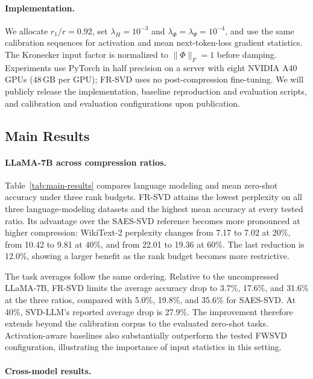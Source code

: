 \documentclass[11pt]{article}
\begin{document}
\paragraph{Implementation.}
We allocate $r_1/r=0.92$, set $\lambda_H=10^{-3}$ and $\lambda_\Phi=\lambda_\Psi=10^{-4}$, and use the same calibration sequences for activation and mean next-token-loss gradient statistics. The Kronecker input factor is normalized to $\|\Phi\|_F=1$ before damping. Experiments use PyTorch in half precision on a server with eight NVIDIA A40 GPUs (48\,GB per GPU); FR-SVD uses no post-compression fine-tuning. We will publicly release the implementation, baseline reproduction and evaluation scripts, and calibration and evaluation configurations upon publication.


\subsection{Main Results}\label{sec:main-results-llama7b}



\paragraph{LLaMA-7B across compression ratios.}

Table~\ref{tab:main-results} compares language modeling and mean zero-shot accuracy under three rank budgets. FR-SVD attains the lowest perplexity on all three language-modeling datasets and the highest mean accuracy at every tested ratio. Its advantage over the SAES-SVD reference becomes more pronounced at higher compression: WikiText-2 perplexity changes from 7.17 to 7.02 at 20\%, from 10.42 to 9.81 at 40\%, and from 22.01 to 19.36 at 60\%. The last reduction is 12.0\%, showing a larger benefit as the rank budget becomes more restrictive.

The task averages follow the same ordering. Relative to the uncompressed LLaMA-7B, FR-SVD limits the average accuracy drop to 3.7\%, 17.6\%, and 31.6\% at the three ratios, compared with 5.0\%, 19.8\%, and 35.6\% for SAES-SVD. At 40\%, SVD-LLM's reported average drop is 27.9\%. The improvement therefore extends beyond the calibration corpus to the evaluated zero-shot tasks. Activation-aware baselines also substantially outperform the tested FWSVD configuration, illustrating the importance of input statistics in this setting.

\paragraph{Cross-model results.}
\end{document}
